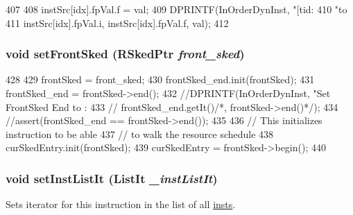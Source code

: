 \begin{DoxyCode}
407 {
408     instSrc[idx].fpVal.f = val;
409     DPRINTF(InOrderDynInst, "[tid:%
410             "to %
411             instSrc[idx].fpVal.i, instSrc[idx].fpVal.f, val);
412 }
\end{DoxyCode}
\hypertarget{classInOrderDynInst_a38747d5669777d42fd95d017abdb0191}{
\subsubsection[{setFrontSked}]{\setlength{\rightskip}{0pt plus 5cm}void setFrontSked ({\bf RSkedPtr} {\em front\_\-sked})}}
\label{classInOrderDynInst_a38747d5669777d42fd95d017abdb0191}



\begin{DoxyCode}
428     {
429         frontSked = front_sked;
430         frontSked_end.init(frontSked);
431         frontSked_end = frontSked->end();
432         //DPRINTF(InOrderDynInst, "Set FrontSked End to : %
433         //        frontSked_end.getIt()/*, frontSked->end()*/);
434         //assert(frontSked_end == frontSked->end());
435 
436         // This initializes instruction to be able
437         // to walk the resource schedule
438         curSkedEntry.init(frontSked);
439         curSkedEntry = frontSked->begin();
440     }
\end{DoxyCode}
\hypertarget{classInOrderDynInst_aeb6ae2640509c7f45f53c03d92f8f920}{
\subsubsection[{setInstListIt}]{\setlength{\rightskip}{0pt plus 5cm}void setInstListIt ({\bf ListIt} {\em \_\-instListIt})}}
\label{classInOrderDynInst_aeb6ae2640509c7f45f53c03d92f8f920}
Sets iterator for this instruction in the list of all \hyperlink{namespaceinsts}{insts}. 


